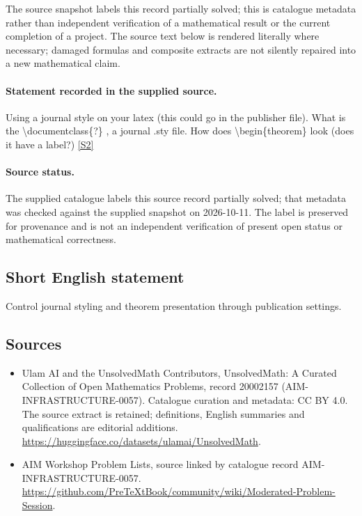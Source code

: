\documentclass[11pt]{article}
\begin{document}
The source snapshot labels this record partially solved; this is catalogue metadata rather than independent verification of a mathematical result or the current completion of a project.
The source text below is rendered literally where necessary; damaged formulas and composite extracts are not silently repaired into a new mathematical claim.
\paragraph{Statement recorded in the supplied source.}
Using a journal style on your latex (this could go in the publisher file). What is the \textbackslash{}documentclass\{?\} , a journal .sty file. How does \textbackslash{}begin\{theorem\} look (does it have a label?) \href{https://github.com/PreTeXtBook/community/wiki/Moderated-Problem-Session}{[S2]}
\paragraph{Source status.}
The supplied catalogue labels this source record partially solved; that metadata was checked against the supplied snapshot on 2026-10-11. The label is preserved for provenance and is not an independent verification of present open status or mathematical correctness.
\subsection{Short English statement}
Control journal styling and theorem presentation through publication settings.
\subsection{Sources}
\begin{itemize}
\item[S1] Ulam AI and the UnsolvedMath Contributors, UnsolvedMath: A Curated Collection of Open Mathematics Problems, record 20002157 (AIM-INFRASTRUCTURE-0057). Catalogue curation and metadata: CC BY 4.0. The source extract is retained; definitions, English summaries and qualifications are editorial additions.
\url{https://huggingface.co/datasets/ulamai/UnsolvedMath}.
\item[S2] AIM Workshop Problem Lists, source linked by catalogue record AIM-INFRASTRUCTURE-0057.
\url{https://github.com/PreTeXtBook/community/wiki/Moderated-Problem-Session}.
\end{itemize}
\end{document}
